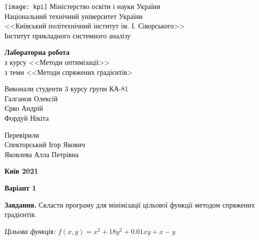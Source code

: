 \documentclass{extreport}
\begin{document}
\begin{titlepage}
    \thispagestyle{empty}
    \begin{center}
        \texttt{[image: kpi]}
        Міністерство освіти і науки України\\
        Національний технічний університет України\\
        <<Київський політехнічний інститут ім. І. Сікорського>>\\
        Інститут прикладного системного аналізу
    \end{center}
    \vspace{40mm}
    \begin{center}
        \textbf{Лабораторна робота} \\
        з курсу <<Методи оптимізації>> \\
        з теми <<Методи спряжених градієнтів>
    \end{center}
    \vspace{20mm}
    \begin{flushleft}
        Виконали студенти 3 курсу групи КА-81 \\
        Галганов Олексій \\
        Єрко Андрій \\
        Фордуй Нікіта
    \end{flushleft}
    \begin{flushright}
        Перевірили \\
        Спекторський Ігор Якович \\
        Яковлева Алла Петрівна
    \end{flushright}
    \vspace{30mm}
    \begin{center}
        \textbf{Київ 2021}
    \end{center}
\end{titlepage}

\begin{center}
    \textbf{Варіант 1}
\end{center}
\noindent\textbf{Завдання.} Скласти програму для мінімізації цільової функції методом спряжених градієнтів.

\emph{Цільова функція:}
$f(x,y) = x^2 + 18y^2 + 0.01xy + x - y$
\end{document}
